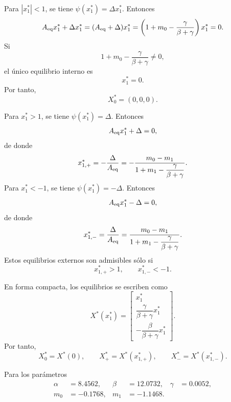 \documentclass[journal]{IEEEtran}
\begin{document}
Para \(|x_1^*|<1\), se tiene \(\psi(x_1^*)=\Delta x_1^*\). Entonces
\[
A_{\rm eq} x_1^*+\Delta x_1^*
=
(A_{\rm eq}+\Delta)x_1^*
=
\left(
1+m_0-\frac{\gamma}{\beta+\gamma}
\right)x_1^*
=0.
\]
Si
\[
1+m_0-\frac{\gamma}{\beta+\gamma}\neq 0,
\]
el único equilibrio interno es
\begin{equation}
\label{eq:origin_equilibrium_ns}
x_1^*=0.
\end{equation}
Por tanto,
\begin{equation}
\label{eq:equilibria_ns_origin}
X_0^*=(0,0,0).
\end{equation}

Para \(x_1^*>1\), se tiene \(\psi(x_1^*)=\Delta\). Entonces
\[
A_{\rm eq} x_1^*+\Delta=0,
\]
de donde
\begin{equation}
\label{eq:x_plus_ns}
x_{1,+}^*=-\frac{\Delta}{A_{\rm eq}}
=
-\frac{m_0-m_1}{
1+m_1-\dfrac{\gamma}{\beta+\gamma}
}.
\end{equation}
Para \(x_1^*<-1\), se tiene \(\psi(x_1^*)=-\Delta\). Entonces
\[
A_{\rm eq} x_1^*-\Delta=0,
\]
de donde
\begin{equation}
\label{eq:x_minus_ns}
x_{1,-}^*=\frac{\Delta}{A_{\rm eq}}
=
\frac{m_0-m_1}{
1+m_1-\dfrac{\gamma}{\beta+\gamma}
}.
\end{equation}
Estos equilibrios externos son admisibles sólo si
\[
x_{1,+}^*>1,
\qquad
x_{1,-}^*<-1.
\]

En forma compacta, los equilibrios se escriben como
\begin{equation}
\label{eq:X_equilibrium_map_ns}
X^*(x_1^*)
=
\begin{bmatrix}
x_1^*\\[1mm]
\dfrac{\gamma}{\beta+\gamma}x_1^*\\[3mm]
-\dfrac{\beta}{\beta+\gamma}x_1^*
\end{bmatrix}.
\end{equation}
Por tanto,
\begin{equation}
X_0^*=X^*(0),
\qquad
X_+^*=X^*(x_{1,+}^*),
\qquad
X_-^*=X^*(x_{1,-}^*).
\end{equation}

Para los parámetros
\begin{equation}
  \label{eq:danca_params_ns}
  \begin{aligned}
\alpha&=8.4562, & \beta&=12.0732, & \gamma&=0.0052,\\
m_0&=-0.1768, & m_1&=-1.1468.
\end{aligned}
\end{equation}
\end{document}
